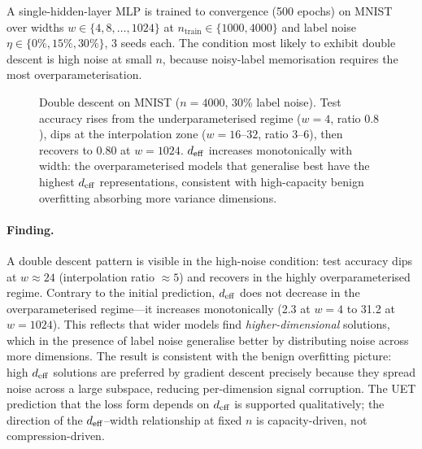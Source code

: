 A single-hidden-layer MLP is trained to convergence (500 epochs) on MNIST
over widths $w \in \{4, 8, \ldots, 1024\}$ at $n_\mathrm{train} \in \{1000, 4000\}$
and label noise $\eta \in \{0\%, 15\%, 30\%\}$, 3 seeds each.
The condition most likely to exhibit double descent is high noise at small $n$,
because noisy-label memorisation requires the most overparameterisation.

\begin{figure}[H]
\centering
{}
\caption{Double descent on MNIST ($n{=}4000$, 30\% label noise).
Test accuracy rises from the underparameterised regime ($w{=}4$, ratio $0.8$),
dips at the interpolation zone ($w{=}16$--$32$, ratio $3$--$6$), then recovers
to 0.80 at $w{=}1024$.
$d_{\mathrm{eff}}$ increases monotonically with width: the overparameterised models that
generalise best have the highest $d_{\mathrm{eff}}$ representations, consistent with
high-capacity benign overfitting absorbing more variance dimensions.}
\label{fig:dd-v2}
\end{figure}

\paragraph{Finding.}
A double descent pattern is visible in the high-noise condition:
test accuracy dips at $w \approx 24$ (interpolation ratio ${\approx}5$) and
recovers in the highly overparameterised regime.
Contrary to the initial prediction, $d_{\mathrm{eff}}$ does not decrease in the overparameterised
regime---it increases monotonically (2.3 at $w{=}4$ to 31.2 at $w{=}1024$).
This reflects that wider models find \emph{higher-dimensional} solutions, which
in the presence of label noise generalise better by distributing noise across more
dimensions.
The result is consistent with the benign overfitting picture: high $d_{\mathrm{eff}}$ solutions
are preferred by gradient descent precisely because they spread noise across a
large subspace, reducing per-dimension signal corruption.
The UET prediction that the loss form depends on $d_{\mathrm{eff}}$ is supported qualitatively;
the direction of the $d_{\mathrm{eff}}$--width relationship at fixed $n$ is capacity-driven,
not compression-driven.

